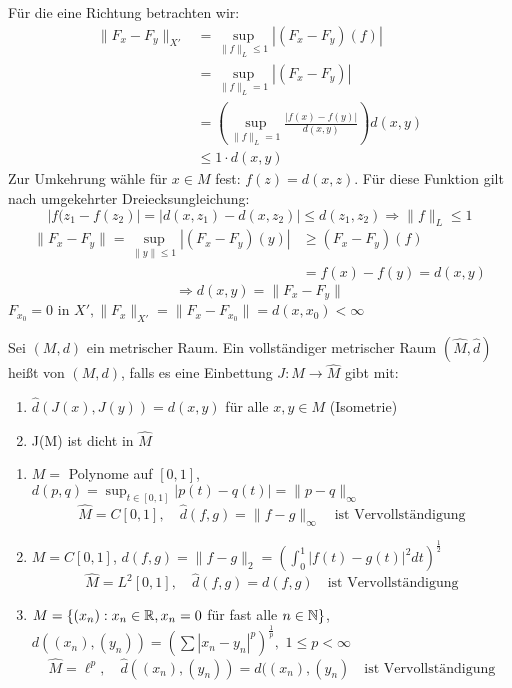 \begin{beweis}
	Für die eine Richtung betrachten wir:
	\begin{align*}
		\| F_{x} - F_{y} \|_{X'}  & = \sup_{\| f \|_{L} \leq 1} |(F_{x} - F_{y})(f)| \\
								  & = \sup_{\| f \|_{L} = 1} |(F_{x} - F_{y})| \\
								  & = \left( \sup_{\| f \|_{L} = 1} \frac{|f(x) - f(y)|}{d(x, y)} \right) d(x, y) \\
								  & \leq 1 \cdot d(x, y)
	\end{align*}
	Zur Umkehrung wähle für $x \in M$ fest: $f(z) = d(x, z)$. Für diese Funktion gilt nach umgekehrter Dreiecksungleichung: \\
	\[ |f(z_{1} - f(z_{2})| = | d(x, z_{1}) - d(x, z_{2}) | \leq d(z_{1}, z_{2}) \Rightarrow \| f \|_{L} \leq 1 \]
	\begin{align*}
		\| F_{x} - F_{y} \| = \sup_{\|y \| \leq 1} |(F_{x} - F_{y})(y)| & \geq (F_{x} - F_{y})(f) \\
																		& = f(x) - f(y) = d(x, y)
	\end{align*}
	\[ \Rightarrow d(x, y) = \| F_{x} - F_{y} \| \]
	$F_{x_{0}} = 0$ in $X', \| F_{x} \|_{X'} = \| F_{x} - F_{x_{0}} \| = d(x, x_{0}) < \infty$
\end{beweis}


\begin{definition}
	Sei $(M, d)$ ein metrischer Raum. Ein vollständiger metrischer Raum $(\hat M, \hat d)$ hei{\ss}t  von $(M, d)$, falls es eine Einbettung $J : M \rightarrow \hat M$ gibt mit:
	\begin{enumerate}[label=\roman*\upshape)]
		\item $\hat d (J(x), J(y)) = d(x, y)$ für alle $x, y \in M$ (Isometrie)
		\item J(M) ist dicht in $\hat{M}$
	\end{enumerate}
\end{definition}


\begin{beispiel}
	\begin{enumerate}[label=\alph*\upshape)]	
		\item $M =$ Polynome auf $[0, 1]$, $d(p, q) = \sup_{t \in [0, 1]} |p(t) - q(t)| = \| p - q \|_{\infty}$
			\[ \hat M = C[0, 1], \quad \hat d(f, g)= \| f - g \|_{\infty} \quad \text{ist Vervollständigung} \]
		\item $M = C[0, 1]$, $d(f, g) = \|f - g\|_{2} = \left( \int_{0}^{1} |f(t) - g(t)|^{2} dt \right)^{\frac{1}{2}}$
			\[ \hat M = L^{2}[0, 1], \quad \hat d(f, g) = d(f, g) \quad \text{ist Vervollständigung} \]
		\item $M = \{ (x_{n}): x_{n} \in \mathbb{R}, x_{n} = 0$ für fast alle $n \in \mathbb{N} \}$, $d((x_{n}), (y_{n})) = \left( \sum |x_{n} - y_{n}|^{p} \right)^{\frac{1}{p}},$ $1 \leq p < \infty$
			\[ \hat M = \ell^{p}, \quad \hat d((x_{n}), (y_{n})) = d((x_{n}), (y_{n}) \quad \text{ist Vervollständigung} \]
	\end{enumerate}
\end{beispiel}


